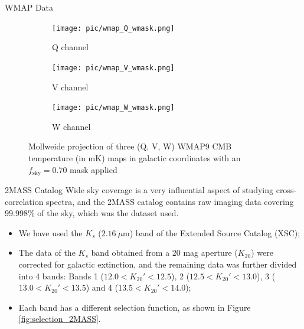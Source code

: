 \documentclass[serif, aspectratio=169]{beamer}
\begin{document}
\begin{frame}{WMAP Data}
    \begin{figure}
        \centering
        \begin{subfigure}[b]{0.32\linewidth}
            \texttt{[image: pic/wmap\_Q\_wmask.png]}
            \caption{Q channel}
            \label{fig:wmap_Q}
        \end{subfigure}
        \hfill
        \begin{subfigure}[b]{0.32\linewidth}
            \texttt{[image: pic/wmap\_V\_wmask.png]}
            \caption{V channel}
            \label{fig:wmap_V}
        \end{subfigure}
        \hfill
        \begin{subfigure}[b]{0.32\linewidth}
            \texttt{[image: pic/wmap\_W\_wmask.png]}
            \caption{W channel}
            \label{fig:wmap_W}
        \end{subfigure}
    \caption{Mollweide projection of three (Q, V, W) WMAP9 CMB temperature (in mK) maps in galactic coordinates with an $f_\text{sky}=0.70$ mask applied}
    \label{fig:wmap_maps}
    \end{figure}
\end{frame}

\begin{frame}{2MASS Catalog}
Wide sky coverage is a very influential aspect of studying cross-correlation spectra, and the 2MASS catalog contains raw imaging data covering $99.998\%$ of the sky, which was the dataset used. 

\begin{itemize}
	\item We have used the $K_s$ ($\SI{2.16}{\mu \meter}$) band of the Extended Source Catalog (XSC);
	\item The data of the $K_s$ band obtained from a 20 mag aperture ($K_{20}$) were corrected for galactic extinction, and the remaining data was further divided into 4 bands: Bands 1 ($12.0<K_{20}'<12.5$), 2 ($12.5<K_{20}'<13.0$), 3 ($13.0<K_{20}'<13.5$) and 4 ($13.5<K_{20}'<14.0$);
	\item Each band has a different selection function, as shown in Figure \ref{fig:selection_2MASS}.
\end{itemize}
\end{frame}
\end{document}

